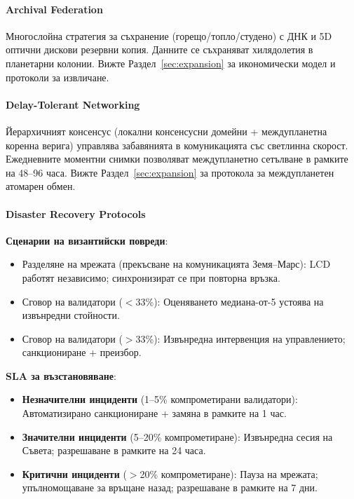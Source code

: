 \documentclass[11pt]{article}
\begin{document}
\paragraph{Archival Federation}
Многослойна стратегия за съхранение (горещо/топло/студено) с ДНК и 5D оптични дискови резервни копия. Данните се съхраняват хилядолетия в планетарни колонии. Вижте Раздел~\ref{sec:expansion} за икономически модел и протоколи за извличане.

\paragraph{Delay-Tolerant Networking}
Йерархичният консенсус (локални консенсусни домейни + междупланетна коренна верига) управлява забавянията в комуникацията със светлинна скорост. Ежедневните моментни снимки позволяват междупланетно сетълване в рамките на 48--96 часа. Вижте Раздел~\ref{sec:expansion} за протокола за междупланетен атомарен обмен.

\paragraph{Disaster Recovery Protocols}
\textbf{Сценарии на византийски повреди}:
\begin{itemize}[noitemsep]
  \item Разделяне на мрежата (прекъсване на комуникацията Земя--Марс): LCD работят независимо; синхронизират се при повторна връзка.
  \item Сговор на валидатори ($<$33\%): Оценяването медиана-от-5 устоява на извънредни стойности.
  \item Сговор на валидатори ($>$33\%): Извънредна интервенция на управлението; санкциониране + преизбор.
\end{itemize}

\textbf{SLA за възстановяване}:
\begin{itemize}[noitemsep]
  \item \textbf{Незначителни инциденти} (1--5\% компрометирани валидатори): Автоматизирано санкциониране + замяна в рамките на 1 час.
  \item \textbf{Значителни инциденти} (5--20\% компрометиране): Извънредна сесия на Съвета; разрешаване в рамките на 24 часа.
  \item \textbf{Критични инциденти} ($>$20\% компрометиране): Пауза на мрежата; упълномощаване за връщане назад; разрешаване в рамките на 7 дни.
\end{itemize}
\end{document}
